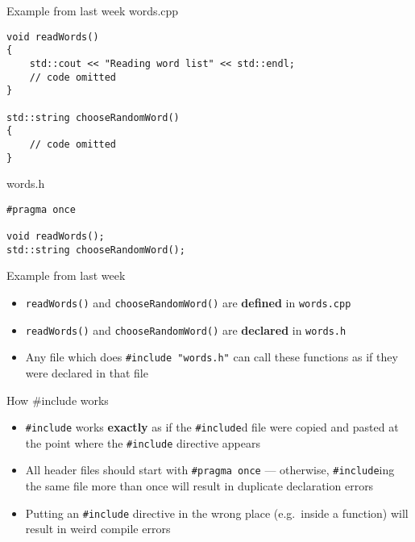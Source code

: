 \begin{frame}[fragile]{Example from last week}
    words.cpp
    \begin{lstlisting}
void readWords()
{
    std::cout << "Reading word list" << std::endl;
    // code omitted
}

std::string chooseRandomWord()
{
    // code omitted
}
    \end{lstlisting}
    
    words.h
    \begin{lstlisting}
#pragma once

void readWords();
std::string chooseRandomWord();
    \end{lstlisting}
\end{frame}

\begin{frame}[fragile]{Example from last week}
    \begin{itemize}
        \item \lstinline{readWords()} and \lstinline{chooseRandomWord()} are \textbf{defined} in \texttt{words.cpp} \pause
        \item \lstinline{readWords()} and \lstinline{chooseRandomWord()} are \textbf{declared} in \texttt{words.h} \pause
        \item Any file which does \lstinline{#include "words.h"} can call these functions as if they were declared in that file
    \end{itemize}
\end{frame}

\begin{frame}[fragile]{How \#include works}
    \begin{itemize}
        \item \lstinline{#include} works \textbf{exactly} as if the \lstinline{#include}d file were copied and pasted
            at the point where the \lstinline{#include} directive appears \pause
        \item All header files should start with \lstinline{#pragma once} --- otherwise,
            \lstinline{#include}ing the same file more than once will result in duplicate declaration errors \pause
        \item Putting an \lstinline{#include} directive in the wrong place (e.g.\ inside a function) will result in
            weird compile errors
    \end{itemize}
\end{frame}
